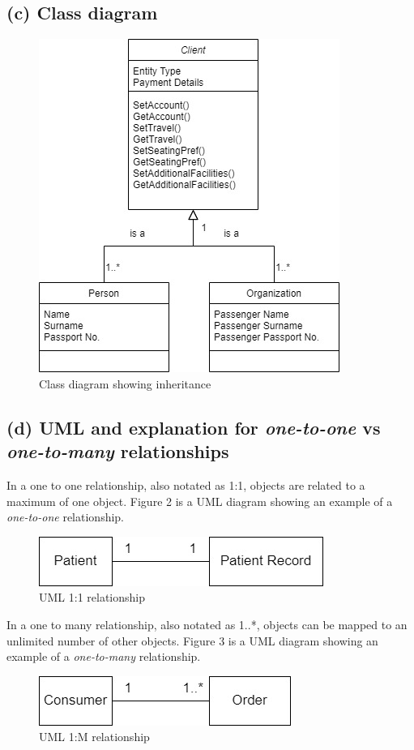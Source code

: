 \documentclass{article}
\begin{document}
\subsection{(c) Class diagram}
\begin{figure}[ht]
	\centering
	\includegraphics[scale=0.6]{2_c_class_diagram_client_person_org.jpg}
	\caption{Class diagram showing inheritance}
	\label{fig:class_diag_client_person_org}
\end{figure}
\newpage

\subsection{(d) UML and explanation for \textit{one-to-one} vs \textit{one-to-many} relationships}
In a one to one relationship, also notated as 1:1, objects are related to a maximum of one object. Figure 2 is a UML diagram showing an example of a \textit{one-to-one} relationship.
\begin{figure}[h]
	\centering
	\includegraphics[scale=0.6]{2_d_1to1.jpg}
	\caption{UML 1:1 relationship}
	\label{fig:1to1relationship}
\end{figure}

In a one to many relationship, also notated as 1..*, objects can be mapped to an unlimited number of other objects. Figure 3 is a UML diagram showing an example of a \textit{one-to-many} relationship.
\begin{figure}[h]
	\centering
	\includegraphics[scale=0.6]{2_d_1toM.jpg}
	\caption{UML 1:M relationship}
	\label{fig:1toMrelationship}
\end{figure}
\end{document}
